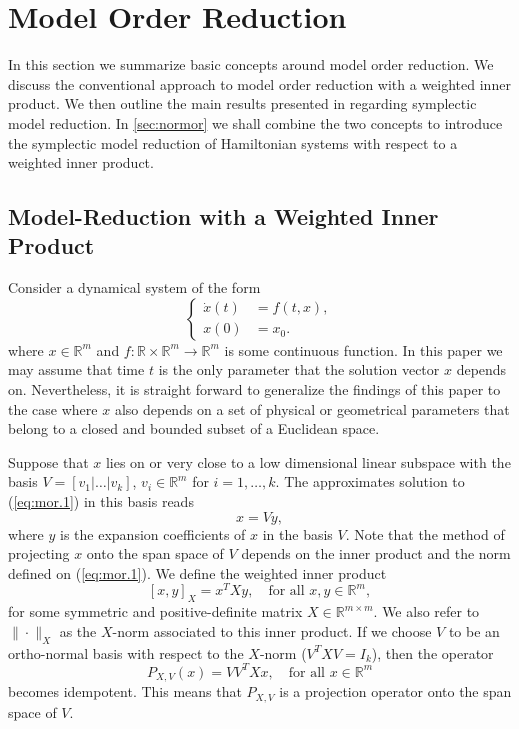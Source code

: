\section{Model Order Reduction}
\label{sec:mor}

In this section we summarize basic concepts around model order reduction. We discuss the conventional approach to model order reduction with a weighted inner product. We then outline the main results presented in \cite{doi:10.1137/17M1111991} regarding symplectic model reduction. In \cref{sec:normor} we shall combine the two concepts to introduce the symplectic model reduction of Hamiltonian systems with respect to a weighted inner product.

\subsection{Model-Reduction with a Weighted Inner Product} \label{sec:mor.1}
Consider a dynamical system of the form
\begin{equation} \label{eq:mor.1}
\left\{
\begin{aligned}
	\dot x(t) &= f(t,x), \\
	x(0) &= x_0.
\end{aligned}
\right.
\end{equation}
where $x\in \mathbb R^{m}$ and $f:\mathbb R \times \mathbb R^{m} \to \mathbb R^{m}$ is some continuous function. In this paper we may assume that time $t$ is the only parameter that the solution vector $x$ depends on. Nevertheless, it is straight forward to generalize the findings of this paper to the case where $x$ also depends on a set of physical or geometrical parameters that belong to a closed and bounded subset of a Euclidean space.

Suppose that $x$ lies on or very close to a low dimensional linear subspace with the basis $V=[v_1|\dots|v_k]$, $v_i\in \mathbb R^{m}$ for $i=1,\dots,k$. The approximates solution to (\ref{eq:mor.1}) in this basis reads
\begin{equation} \label{eq:mor.2}
	x = Vy,
\end{equation}
where $y$ is the expansion coefficients of $x$ in the basis $V$. Note that the method of projecting $x$ onto the span space of $V$ depends on the inner product and the norm defined on (\ref{eq:mor.1}). We define the weighted inner product
\begin{equation} \label{eq:mor.3}
	[x,y]_X = x^TXy,\quad \text{for all } x,y \in \mathbb R^m,
\end{equation}
for some symmetric and positive-definite matrix $X\in \mathbb{R}^{m\times m}$. We also refer to $\|\cdot \|_X$ as the $X$-norm associated to this inner product. If we choose $V$ to be an ortho-normal basis with respect to the $X$-norm ($V^TXV=I_k$), then the operator
\begin{equation} \label{eq:mor.4}
	P_{X,V}(x) = VV^TXx, \quad \text{for all } x\in \mathbb R^{m}
\end{equation}
becomes idempotent. This means that $P_{X,V}$ is a projection operator onto the span space of $V$.

